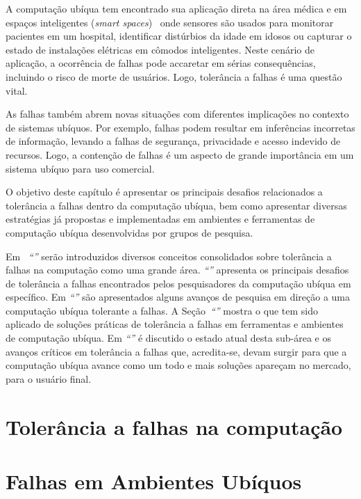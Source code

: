 \documentclass{SBCbookchapter}
\begin{document}
A computação ubíqua tem encontrado sua aplicação direta na área médica\linebreak\cite{Bang03} e em espaços inteligentes (\emph{smart spaces})~\cite{Kidd99} onde sensores são usados para monitorar pacientes em um hospital, identificar distúrbios da idade em idosos ou capturar o estado de instalações elétricas em cômodos inteligentes. Neste cenário de aplicação, a ocorrência de falhas pode accaretar em sérias consequências, incluindo o risco de morte de usuários. Logo, tolerância a falhas é uma questão vital.

As falhas também abrem novas situações com diferentes implicações no contexto de sistemas ubíquos. Por exemplo, falhas podem resultar em inferências incorretas de informação, levando a falhas de segurança, privacidade e acesso indevido de recursos. Logo, a contenção de falhas é um aspecto de grande importância em um sistema ubíquo para uso comercial.

O objetivo deste capítulo é apresentar os principais desafios relacionados a tolerância a falhas dentro da computação ubíqua, bem como apresentar diversas estratégias já propostas e implementadas em ambientes e ferramentas de computação ubíqua desenvolvidas por grupos de pesquisa.

Em ~\emph{``''} serão introduzidos diversos conceitos consolidados sobre tolerância a falhas na computação como uma grande área. \emph{``''} apresenta os principais desafios de tolerância a falhas encontrados pelos pesquisadores da computação ubíqua em específico. Em \emph{``''} são apresentados alguns avanços de pesquisa em direção a uma computação ubíqua tolerante a falhas. A Seção~\emph{``''} mostra o que tem sido aplicado de soluções práticas de tolerância a falhas em ferramentas e ambientes de computação ubíqua. Em \emph{``''} é discutido o estado atual desta sub-área e os avanços críticos em tolerância a falhas que, acredita-se, devam surgir para que a computação ubíqua avance como um todo e mais soluções apareçam no mercado, para o usuário final.


\section{Tolerância a falhas na computação}
\label{sec:falhas_comp}


\section{Falhas em Ambientes Ubíquos}
\label{sec:falhas_ubicomp}

\end{document}
